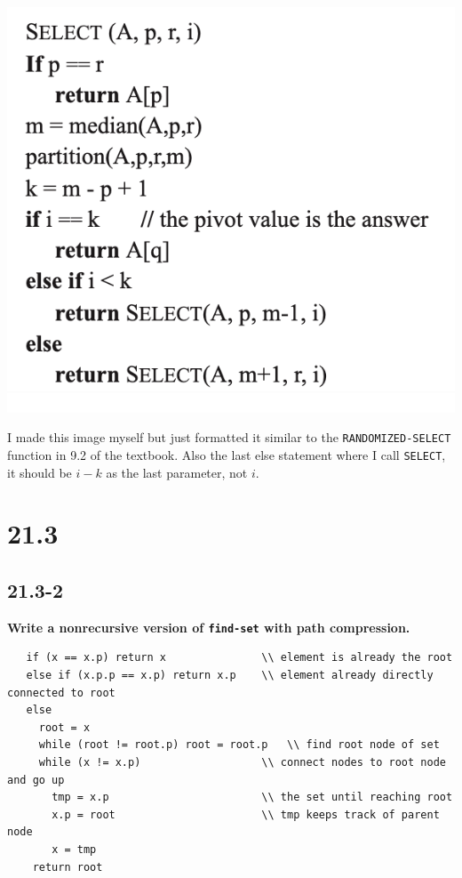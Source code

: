 \documentclass[11pt]{article}
\begin{document}
\includegraphics[scale=0.8]{select.png}

I made this image myself but just formatted it similar to the \texttt{RANDOMIZED-SELECT} function in 
9.2 of the textbook.  Also the last else statement where I call \texttt{SELECT}, it should be $i-k$ as 
the last parameter, not $i$.
 \newpage

 \section*{21.3}
 \subsection*{21.3-2}
 \textbf{Write a nonrecursive version of \texttt{find-set} with path compression.}
 \begin{verbatim}
   if (x == x.p) return x               \\ element is already the root
   else if (x.p.p == x.p) return x.p    \\ element already directly connected to root
   else 
     root = x
     while (root != root.p) root = root.p   \\ find root node of set
     while (x != x.p)                   \\ connect nodes to root node and go up
       tmp = x.p                        \\ the set until reaching root
       x.p = root                       \\ tmp keeps track of parent node
       x = tmp 
    return root
 \end{verbatim}
\end{document}
